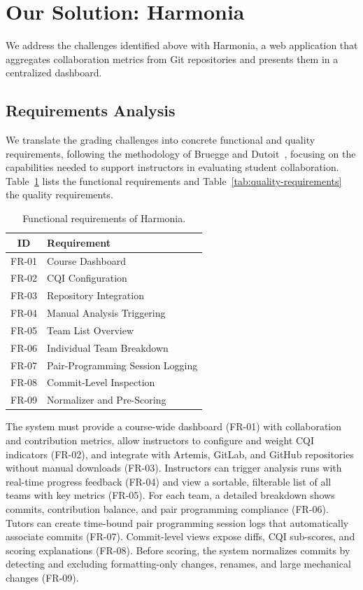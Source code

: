 \documentclass[sigconf]{acmart}
\begin{document}
\section{Our Solution: Harmonia}

We address the challenges identified above with Harmonia, a web application that aggregates collaboration metrics from Git repositories and presents them in a centralized dashboard.

\subsection{Requirements Analysis}

We translate the grading challenges into concrete functional and quality requirements, following the methodology of Bruegge and Dutoit~\cite{bruegge2009oose}, focusing on the capabilities needed to support instructors in evaluating student collaboration. Table~\ref{tab:functional-requirements} lists the functional requirements and Table~\ref{tab:quality-requirements} the quality requirements.

\begin{table}[h]
  \caption{Functional requirements of Harmonia.}
  \label{tab:functional-requirements}
  \begin{tabular}{cl}
    \toprule
    \textbf{ID} & \textbf{Requirement} \\
    \midrule
    FR-01 & Course Dashboard \\
    FR-02 & CQI Configuration \\
    FR-03 & Repository Integration \\
    FR-04 & Manual Analysis Triggering \\
    FR-05 & Team List Overview \\
    FR-06 & Individual Team Breakdown \\
    FR-07 & Pair-Programming Session Logging \\
    FR-08 & Commit-Level Inspection \\
    FR-09 & Normalizer and Pre-Scoring \\
    \bottomrule
  \end{tabular}
\end{table}

The system must provide a course-wide dashboard (FR-01) with collaboration and contribution metrics, allow instructors to configure and weight CQI indicators (FR-02), and integrate with Artemis, GitLab, and GitHub repositories without manual downloads (FR-03). Instructors can trigger analysis runs with real-time progress feedback (FR-04) and view a sortable, filterable list of all teams with key metrics (FR-05). For each team, a detailed breakdown shows commits, contribution balance, and pair programming compliance (FR-06). Tutors can create time-bound pair programming session logs that automatically associate commits (FR-07). Commit-level views expose diffs, CQI sub-scores, and scoring explanations (FR-08). Before scoring, the system normalizes commits by detecting and excluding formatting-only changes, renames, and large mechanical changes (FR-09).
\end{document}
